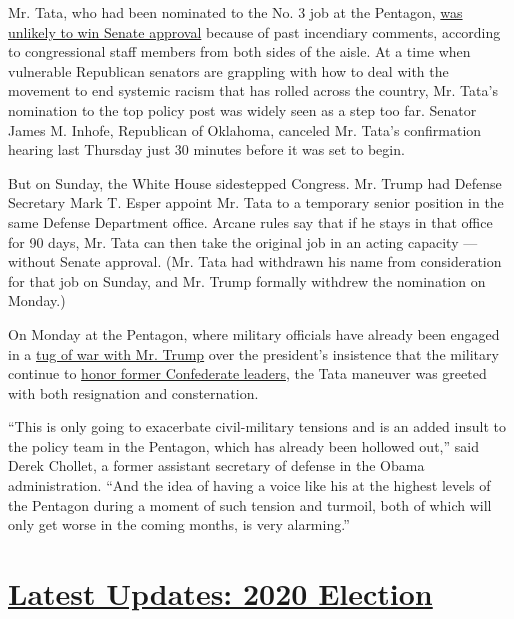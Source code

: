 Mr. Tata, who had been nominated to the No. 3 job at the Pentagon,
\href{https://www.nytimes3xbfgragh.onion/2020/07/30/us/politics/trump-inhofe-tata-pentagon.html}{was
unlikely to win Senate approval} because of past incendiary comments,
according to congressional staff members from both sides of the aisle.
At a time when vulnerable Republican senators are grappling with how to
deal with the movement to end systemic racism that has rolled across the
country, Mr. Tata's nomination to the top policy post was widely seen as
a step too far. Senator James M. Inhofe, Republican of Oklahoma,
canceled Mr. Tata's confirmation hearing last Thursday just 30 minutes
before it was set to begin.

But on Sunday, the White House sidestepped Congress. Mr. Trump had
Defense Secretary Mark T. Esper appoint Mr. Tata to a temporary senior
position in the same Defense Department office. Arcane rules say that if
he stays in that office for 90 days, Mr. Tata can then take the original
job in an acting capacity --- without Senate approval. (Mr. Tata had
withdrawn his name from consideration for that job on Sunday, and Mr.
Trump formally withdrew the nomination on Monday.)

On Monday at the Pentagon, where military officials have already been
engaged in a
\href{https://www.nytimes3xbfgragh.onion/2020/07/17/us/politics/pentagon-trump-confederate-symbols.html}{tug
of war with Mr. Trump} over the president's insistence that the military
continue to
\href{https://www.nytimes3xbfgragh.onion/2020/07/20/us/politics/congress-trump-confederate-base-names.html}{honor
former Confederate leaders}, the Tata maneuver was greeted with both
resignation and consternation.

``This is only going to exacerbate civil-military tensions and is an
added insult to the policy team in the Pentagon, which has already been
hollowed out,'' said Derek Chollet, a former assistant secretary of
defense in the Obama administration. ``And the idea of having a voice
like his at the highest levels of the Pentagon during a moment of such
tension and turmoil, both of which will only get worse in the coming
months, is very alarming.''

\hypertarget{latest-updates-2020-election}{%
\section{\texorpdfstring{\href{https://www.nytimes3xbfgragh.onion/2020/08/03/us/elections/biden-vs-trump.html?action=click\&pgtype=Article\&state=default\&region=MAIN_CONTENT_1\&context=storylines_live_updates}{Latest
Updates: 2020
Election}}{Latest Updates: 2020 Election}}\label{latest-updates-2020-election}}

